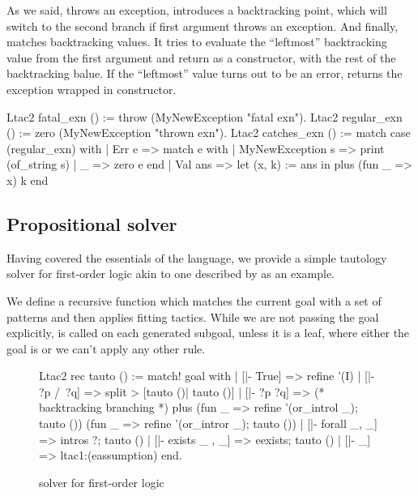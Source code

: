 As we said,  throws an exception,  introduces a backtracking point, which will switch to the second branch if first argument throws an exception.
And finally,  matches backtracking values.
It tries to evaluate the ``leftmost'' backtracking value from the first argument and return as a  constructor, with the rest of the backtracking balue.
If the ``leftmost'' value turns out to be an error,  returns the exception wrapped in  constructor.

\begin{coq}
Ltac2 fatal_exn () := throw (MyNewException "fatal exn").
Ltac2 regular_exn () := zero (MyNewException "thrown exn").
Ltac2 catches_exn () := match case (regular_exn) with
| Err e => match e with
  | MyNewException s => print (of_string s)
  | _ => zero e
  end
| Val ans => let (x, k) := ans in
  plus (fun _ => x) k
end
\end{coq}

\subsection{Propositional solver}
\label{sec:propositional-solver}

Having covered the essentials of the language, we provide a simple tautology solver for first-order logic akin to one described by \citet{zilianiMtacMonadTyped2013} as an example.

We define a recursive function  which matches the current goal with a set of patterns and then applies fitting tactics.
While we are not passing the goal explicitly,  is called on each generated subgoal, unless it is a leaf, where either the goal is  or we can't apply any other rule.

\begin{figure}[H]
\begin{coq}
Ltac2 rec tauto () :=
  match! goal with
  | [|- True] =>
   refine '(I)
  | [|- ?p /\ ?q] =>
    split > [tauto ()| tauto ()]
  | [|- ?p \/ ?q] =>
    (* backtracking branching *)
    plus (fun _ => refine '(or_introl _); tauto ())
         (fun _ => refine '(or_intror _); tauto ())
  | [|- forall _, _] =>
    intros ?; tauto ()
  | [|- exists _ , _] =>
    eexists; tauto ()
  | [|- _] => ltac1:(eassumption)
  end.
\end{coq}
\caption{solver for first-order logic}
\label{fig:ltac2-solver}
\end{figure}

